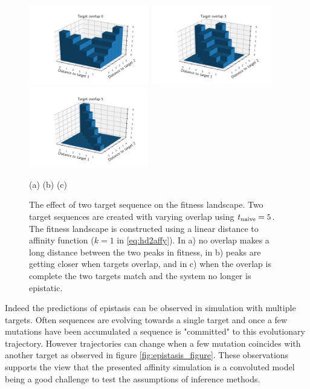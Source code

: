 \begin{figure}[!ht]
\begin{center}
\includegraphics[height=35mm]{figures/fitness_overlap0.pdf}
\includegraphics[height=35mm]{figures/fitness_overlap3.pdf}
\includegraphics[height=35mm]{figures/fitness_overlap5.pdf} \newline%
\end{center}
\vspace{-6mm} \hspace{26mm} (a) \hspace{39mm} (b) \hspace{39mm} (c)
    \caption{
    \label{fig:epistasis}
        The effect of two target sequence on the fitness landscape.
        Two target sequences are created with varying overlap using $t_{\text{naive}}=5$.
        The fitness landscape is constructed using a linear distance to affinity function ($k=1$ in \eqref{eq:hd2affy}).
        In a) no overlap makes a long distance between the two peaks in fitness, in b) peaks are getting closer when targets overlap, and in c) when the overlap is complete the two targets match and the system no longer is epistatic.
        }
\end{figure}


Indeed the predictions of epistasis can be observed in simulation with multiple targets.
Often sequences are evolving towards a single target and once a few mutations have been accumulated a sequence is "committed" to this evolutionary trajectory.
However trajectories can change when a few mutation coincides with another target as observed in figure \ref{fig:epistasis_figure}.
These observations supports the view that the presented affinity simulation is a convoluted model being a good challenge to test the assumptions of inference methods.


